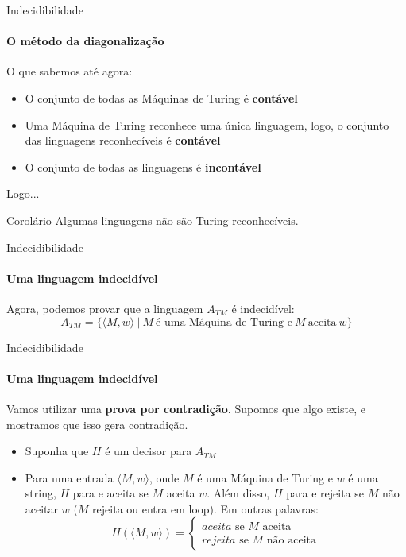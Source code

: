 \documentclass{beamer}
\begin{document}
\begin{frame}{Indecidibilidade}
	\framesubtitle{O método da diagonalização}
	O que sabemos até agora:
	\begin{itemize}
		\item O conjunto de todas as Máquinas de Turing é \textbf{contável}
		\item Uma Máquina de Turing reconhece uma única linguagem, logo, o conjunto das linguagens reconhecíveis é \textbf{contável}
		\item O conjunto de todas as linguagens é \textbf{incontável}
	\end{itemize}
	Logo...\pause
	\begin{block}{Corolário}
		Algumas linguagens não são Turing-reconhecíveis.
	\end{block}
\end{frame}
\begin{frame}{Indecidibilidade}
	\framesubtitle{Uma linguagem indecidível}
	Agora, podemos provar que a linguagem $A_{TM}$ é indecidível:
	\begin{equation*}
		A_{TM} = \{\langle M,w\rangle\ |\ M\ \text{é uma Máquina de Turing e}\ M\ \text{aceita}\ w\}
	\end{equation*}
\end{frame}
\begin{frame}{Indecidibilidade}
	\framesubtitle{Uma linguagem indecidível}
	Vamos utilizar uma \textbf{prova por contradição}. Supomos que algo existe, e mostramos que isso gera contradição.
	\begin{itemize}
		\item Suponha que $H$ é um decisor para $A_{TM}$
		\item Para uma entrada $\langle M, w\rangle$, onde $M$ é uma Máquina de Turing e $w$ é uma string, $H$ para e aceita se $M$ aceita $w$. Além disso, $H$ para e rejeita se $M$ não aceitar $w$ ($M$ rejeita ou entra em loop). Em outras palavras:
		\begin{equation*}
			H\left(\langle M,w\rangle\right) = \begin{cases}
			aceita\text{ se }M\text{ aceita} \\
			rejeita\text{ se }M\text{ não aceita}
			\end{cases}
		\end{equation*}
	\end{itemize}
\end{frame}
\end{document}
